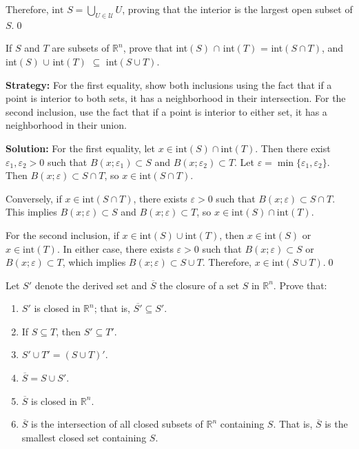 Therefore, $\text{int } S = \bigcup_{U \in \mathcal{U}} U$, proving that the interior is the largest open subset of $S$.\qed


\begin{problembox}
If $S$ and $T$ are subsets of $\mathbb{R}^n$, prove that
int$(S)$ $\cap$ int$(T)$ = int$(S \cap T)$,
and int$(S)$ $\cup$ int$(T)$ $\subseteq$ int$(S \cup T)$.
\end{problembox}    

\noindent\textbf{Strategy:} For the first equality, show both inclusions using the fact that if a point is interior to both sets, it has a neighborhood in their intersection. For the second inclusion, use the fact that if a point is interior to either set, it has a neighborhood in their union.

\bigskip\noindent\textbf{Solution:} For the first equality, let $x \in \text{int}(S) \cap \text{int}(T)$. Then there exist $\varepsilon_1, \varepsilon_2 > 0$ such that $B(x;\varepsilon_1) \subset S$ and $B(x;\varepsilon_2) \subset T$. Let $\varepsilon = \min\{\varepsilon_1, \varepsilon_2\}$. Then $B(x;\varepsilon) \subset S \cap T$, so $x \in \text{int}(S \cap T)$.

Conversely, if $x \in \text{int}(S \cap T)$, there exists $\varepsilon > 0$ such that $B(x;\varepsilon) \subset S \cap T$. This implies $B(x;\varepsilon) \subset S$ and $B(x;\varepsilon) \subset T$, so $x \in \text{int}(S) \cap \text{int}(T)$.

For the second inclusion, if $x \in \text{int}(S) \cup \text{int}(T)$, then $x \in \text{int}(S)$ or $x \in \text{int}(T)$. In either case, there exists $\varepsilon > 0$ such that $B(x;\varepsilon) \subset S$ or $B(x;\varepsilon) \subset T$, which implies $B(x;\varepsilon) \subset S \cup T$. Therefore, $x \in \text{int}(S \cup T)$.\qed


\begin{problembox}
Let $S'$ denote the derived set and $\overline{S}$ the closure of a set $S$ in $\mathbb{R}^n$. Prove that:
\begin{enumerate}[label=\alph*)]
\item $S'$ is closed in $\mathbb{R}^n$; that is, $\overline{S'} \subseteq S'$.
\item If $S \subseteq T$, then $S' \subseteq T'$.
\item $S' \cup T' = (S \cup T)'$.
\item $\overline{S} = S \cup S'$.
\item $\overline{S}$ is closed in $\mathbb{R}^n$.
\item $\overline{S}$ is the intersection of all closed subsets of $\mathbb{R}^n$ containing $S$. That is, $\overline{S}$ is the smallest closed set containing $S$.
\end{enumerate}
\end{problembox}

